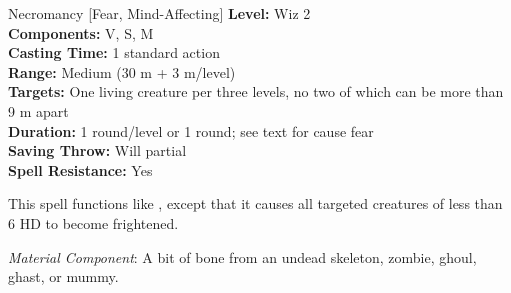 {Necromancy [Fear, Mind-Affecting]}
{
	\textbf{Level:}
	Wiz 2\\
	\textbf{Components:}
	V, S, M\\
	\textbf{Casting Time:}
	1 standard action\\
	\textbf{Range:}
	Medium (30 m + 3 m/level)\\
	\textbf{Targets:}
	One living creature per three levels, no two of which can be more than 9 m apart\\
	\textbf{Duration:}
	1 round/level or 1 round; see text for cause fear\\
	\textbf{Saving Throw:}
	Will partial\\
	\textbf{Spell Resistance:}
	Yes\\
}
{
	This spell functions like , except that it causes all targeted creatures of less than 6 HD to become frightened.

	\textit{Material Component}:
	A bit of bone from an undead skeleton, zombie, ghoul, ghast, or mummy.

}
